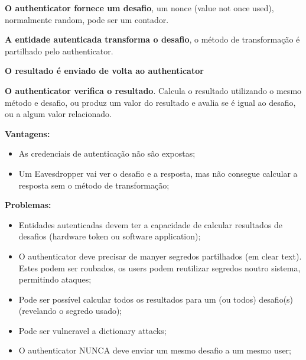 \documentclass{article}
\begin{document}
\begin{flushleft}
  \textbf{O authenticator fornece um desafio}, um nonce (value not once used), normalmente random, pode ser um contador.

  \vspace{2mm}

  \textbf{A entidade autenticada transforma o desafio}, o método de transformação é partilhado pelo authenticator.

  \vspace{2mm}

  \textbf{O resultado é enviado de volta ao authenticator}

  \vspace{2mm}

  \textbf{O authenticator verifica o resultado}. Calcula o resultado utilizando
  o mesmo método e desafio, ou produz um valor do resultado e avalia se é igual
  ao desafio, ou a algum valor relacionado.

  \vspace{2mm}

  \textbf{Vantagens:}
  \begin{itemize}
    \item As credenciais de autenticação não são expostas;
    \item Um Eavesdropper vai ver o desafio e a resposta, mas não consegue
    calcular a resposta sem o método de transformação;
  \end{itemize}

  \pagebreak

  \textbf{Problemas:}

  \begin{itemize}
    \item Entidades autenticadas devem ter a capacidade de calcular resultados de desafios
    (hardware token ou software application);
    \item O authenticator deve precisar de manyer segredos partilhados (em clear text). Estes
    podem ser roubados, os users podem reutilizar segredos noutro sistema, permitindo ataques;
    \item Pode ser possível calcular todos os resultados para um (ou todos) desafio(s) (revelando o segredo usado);
    \item Pode ser vulneravel a dictionary attacks;
    \item O authenticator NUNCA deve enviar um mesmo desafio a um mesmo user;
  \end{itemize}
\end{flushleft}
\end{document}
